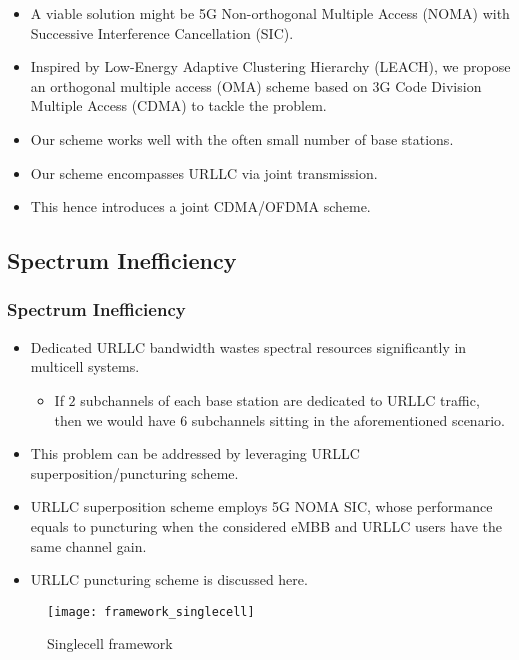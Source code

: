 \begin{frame}
  \begin{itemize}
    \item A viable solution might be 5G Non-orthogonal Multiple Access (NOMA) with Successive Interference Cancellation (SIC). %
    \item Inspired by Low-Energy Adaptive Clustering Hierarchy (LEACH), we propose an orthogonal multiple access (OMA) scheme based on 3G Code Division Multiple Access (CDMA) to tackle the problem\exampleFootnote.
  \end{itemize}
\end{frame}

\begin{frame}
  \begin{itemize}
    \item Our scheme works well with the often small number of base stations.
    \item Our scheme encompasses URLLC  via joint transmission.
    \item This hence introduces a joint CDMA/OFDMA scheme.
  \end{itemize}
\end{frame}

\subsection{Spectrum Inefficiency}
\begin{frame}
  \frametitle{Spectrum Inefficiency}
  \begin{itemize}
    \item Dedicated URLLC bandwidth wastes spectral resources significantly in multicell systems.
      \begin{itemize}
        \item If $2$ subchannels of each base station are dedicated to URLLC traffic, then we would have $6$ subchannels sitting  in the aforementioned scenario.
      \end{itemize}
  \end{itemize}
\end{frame}

\begin{frame}
  \begin{itemize}
    \item This problem can be addressed by leveraging URLLC superposition/puncturing scheme. %
    \item URLLC superposition scheme employs 5G NOMA SIC, whose performance equals to puncturing when the considered eMBB and URLLC users have the same channel gain. %
    \item URLLC puncturing scheme is discussed here.
  \end{itemize}
\end{frame}

\begin{frame}
  \begin{figure}
    \texttt{[image: framework\_singlecell]}
    \caption{Singlecell framework}
  \end{figure}
\end{frame}
